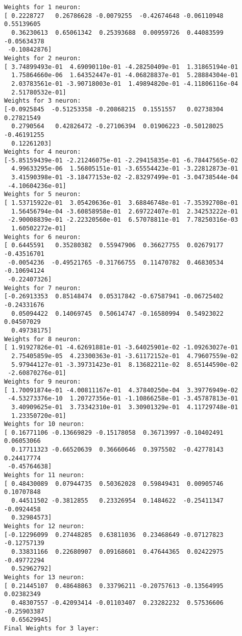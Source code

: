 \documentclass[11pt]{article}
\begin{document}
\begin{Verbatim}[commandchars=\\\{\}]
Weights for 1 neuron:
[ 0.2228727   0.26786628 -0.0079255  -0.42674648 -0.06110948  0.55139605
  0.36230613  0.65061342  0.25393688  0.00959726  0.44083599 -0.05634378
 -0.10842876]
Weights for 2 neuron:
[ 3.74899493e-01  4.69090110e-01 -4.28250409e-01  1.31865194e-01
  1.75864660e-06  1.64352447e-01 -4.06828837e-01  5.28884304e-01
  2.03783561e-01 -3.90718003e-01  1.49894820e-01 -4.11806116e-04
  2.51780532e-01]
Weights for 3 neuron:
[-0.0925845  -0.51253358 -0.20868215  0.1551557   0.02738304  0.27821549
  0.2790564   0.42826472 -0.27106394  0.01906223 -0.50128025 -0.46191255
  0.12261203]
Weights for 4 neuron:
[-5.85159439e-01 -2.21246075e-01 -2.29415835e-01 -6.78447565e-02
  4.99633295e-06  1.56805151e-01 -3.65554423e-01 -3.22812873e-01
  3.41590398e-01 -3.18477153e-02 -2.83297499e-01 -3.04738544e-04
 -4.10604236e-01]
Weights for 5 neuron:
[ 1.53715922e-01  3.05420636e-01  3.68846748e-01 -7.35392708e-01
  1.56456794e-04 -3.60858958e-01  2.69722407e-01  2.34253222e-01
 -2.90008839e-01 -2.22320560e-01  6.57078811e-01  7.78250316e-03
  1.60502272e-01]
Weights for 6 neuron:
[ 0.6445591   0.35280382  0.55947906  0.36627755  0.02679177 -0.43516701
 -0.0054236  -0.49521765 -0.31766755  0.11470782  0.46830534 -0.10694124
 -0.22407326]
Weights for 7 neuron:
[-0.26913353  0.85148474  0.05317842 -0.67587941 -0.06725402 -0.24331676
  0.05094422  0.14069745  0.50614747 -0.16580994  0.54923022  0.04507029
  0.49738175]
Weights for 8 neuron:
[ 1.91927826e-01 -4.62691881e-01 -3.64025901e-02 -1.09263027e-01
  2.75405859e-05  4.23300363e-01 -3.61172152e-01  4.79607559e-02
  5.97944127e-01 -3.39731423e-01  8.13682211e-02  8.65144590e-02
 -2.60870276e-01]
Weights for 9 neuron:
[ 1.70091874e-01 -4.00811167e-01  4.37840250e-04  3.39776949e-02
 -4.53273376e-10  1.20727356e-01 -1.10866258e-01 -3.45787813e-01
  3.40909625e-01  3.73342310e-01  3.30901329e-01  4.11729748e-01
  1.23350720e-01]
Weights for 10 neuron:
[ 0.16771106 -0.13669829 -0.15178058  0.36713997 -0.10402491  0.06053066
  0.17711323 -0.66520639  0.36660646  0.3975502  -0.42778143  0.24417774
 -0.45764638]
Weights for 11 neuron:
[ 0.48430089  0.07944735  0.50362028  0.59849431  0.00905746  0.10707848
  0.44511502 -0.3812855   0.23326954  0.1484622  -0.25411347 -0.0924458
  0.32984573]
Weights for 12 neuron:
[-0.12296099  0.27448285  0.63811036  0.23468649 -0.07127823 -0.12757139
  0.33831166  0.22680907  0.09168601  0.47644365  0.02422975 -0.49772294
  0.52962792]
Weights for 13 neuron:
[ 0.21445107  0.48648863  0.33796211 -0.20757613 -0.13564995  0.02382349
  0.48307557 -0.42093414 -0.01103407  0.23282232  0.57536606 -0.25903387
  0.65629945]
Final Weights for 3 layer:


\end{Verbatim}
\end{document}
